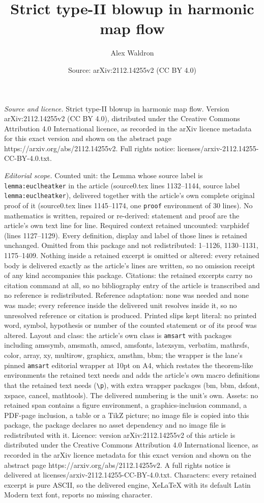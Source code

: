 \documentclass[10pt,a4paper]{amsart}
\title[Strict type-II blowup in harmonic map flow]{Strict type-II blowup in harmonic map flow}
\author{Alex Waldron}
\date{Source: arXiv:2112.14255v2 (CC BY 4.0)}
\begin{document}
\maketitle

\noindent\emph{Source and licence.} Strict type-II blowup in harmonic map flow. Version arXiv:2112.14255v2 (CC BY 4.0), distributed under the Creative Commons Attribution 4.0 International licence, as recorded in the arXiv licence metadata for this exact version and shown on the abstract page https://arxiv.org/abs/2112.14255v2. Full rights notice: licenses/arxiv-2112.14255-CC-BY-4.0.txt.\par\smallskip

\noindent\textit{Editorial scope.} Counted unit: the Lemma whose source label is \texttt{lemma:euclheatker} in the article (source0.tex lines 1132--1144, source label \texttt{lemma:euclheatker}), delivered together with the article's own complete original proof of it (source0.tex lines 1145--1174, one \texttt{proof} environment of 30 lines). No mathematics is written, repaired or re-derived: statement and proof are the article's own text line for line. Required context retained uncounted: varphidef (lines 1127--1129). Every definition, display and label of those lines is retained unchanged. Omitted from this package and not redistributed: 1--1126, 1130--1131, 1175--1409. Nothing inside a retained excerpt is omitted or altered: every retained body is delivered exactly as the article's lines are written, so no omission receipt of any kind accompanies this package. Citations: the retained excerpts carry no citation command at all, so no bibliography entry of the article is transcribed and no reference is redistributed. Reference adaptation: none was needed and none was made; every reference inside the delivered unit resolves inside it, so no unresolved reference or citation is produced. Printed slips kept literal: no printed word, symbol, hypothesis or number of the counted statement or of its proof was altered. Layout and class: the article's own class is \texttt{amsart} with packages including amssymb, amsmath, amscd, amsfonts, latexsym, verbatim, mathrsfs, color, array, xy, multirow, graphicx, amsthm, bbm; the wrapper is the lane's pinned \texttt{amsart} editorial wrapper at 10pt on A4, which restates the theorem-like environments the retained text needs and adds the article's own macro definitions that the retained text needs (\texttt{\textbackslash p}), with extra wrapper packages (bm, bbm, dsfont, xspace, cancel, mathtools). The delivered numbering is the unit's own. Assets: no retained span contains a figure environment, a graphics-inclusion command, a PDF-page inclusion, a table or a TikZ picture; no image file is copied into this package, the package declares no asset dependency and no image file is redistributed with it. Licence: version arXiv:2112.14255v2 of this article is distributed under the Creative Commons Attribution 4.0 International licence, as recorded in the arXiv licence metadata for this exact version and shown on the abstract page https://arxiv.org/abs/2112.14255v2. A full rights notice is delivered at licenses/arxiv-2112.14255-CC-BY-4.0.txt. Characters: every retained excerpt is pure ASCII, so the delivered engine, XeLaTeX with its default Latin Modern text font, reports no missing character.
\end{document}
